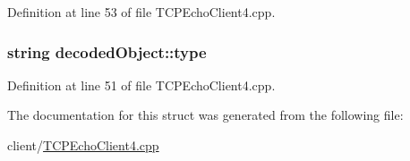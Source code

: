 Definition at line 53 of file T\+C\+P\+Echo\+Client4.\+cpp.

\subsubsection[{\texorpdfstring{type}{type}}]{\setlength{\rightskip}{0pt plus 5cm}string decoded\+Object\+::type}\hypertarget{structdecodedObject_a40e0bde9067ac014de208031bd551139}{}\label{structdecodedObject_a40e0bde9067ac014de208031bd551139}


Definition at line 51 of file T\+C\+P\+Echo\+Client4.\+cpp.



The documentation for this struct was generated from the following file\+:\begin{DoxyCompactItemize}
\item 
client/\hyperlink{TCPEchoClient4_8cpp}{T\+C\+P\+Echo\+Client4.\+cpp}\end{DoxyCompactItemize}
